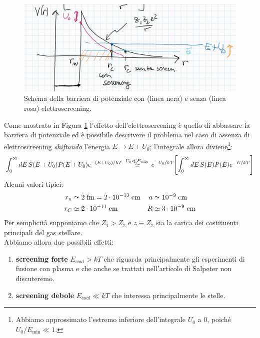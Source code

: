 \begin{figure}[!h]
    \centering
    \includegraphics[scale=0.3]{Immagini/0329_pot_ES.png}
    \caption{Schema della barriera di potenziale con (linea nera) e senza (linea rosa) elettroscreening.}
    \label{0329_schema}
\end{figure}
\noindent Come mostrato in Figura \ref{0329_schema} l'effetto dell'elettroscreening è quello di abbassare la barriera di potenziale ed è possibile descrivere il problema nel caso di assenza di elettroscreening \textit{shiftando} l'energia $E\to E+U_0$; l'integrale allora diviene\footnote{Abbiamo approssimato l'estremo inferiore dell'integrale $U_0$ a 0, poiché $U_0/E_{\min{}}\ll1$.}:
$$\int_0^\infty dE\, S(E+U_0) P(E+U_0) e^{-(E+U_0)/kT}\: \stackrel{U_0\ll E_{\max{}}}{\simeq} e^{-U_0/kT}\Biggl [ \int_0^\infty dE\, S(E) P(E) e^{-E/kT} \Biggr ]$$
Alcuni valori tipici:
\begin{displaymath}
\begin{aligned}
r_n &\simeq 2\;\mbox{fm} = 2\cdot10^{-13}\;\mbox{cm} & a   &\simeq 10^{-9}\;\mbox{cm}\\
r_C &\simeq 2\cdot10^{-11}\;\mbox{cm} & R   &\simeq 3\cdot10^{-9}\;\mbox{cm}
\end{aligned}
\end{displaymath}
Per semplicità supponiamo che $Z_1>Z_2$ e $z\equiv Z_2$ sia la carica dei costituenti principali del gas stellare.\\ Abbiamo allora due possibili effetti:
\begin{enumerate}
    \item \textbf{screening forte} $E_{coul} > kT$ che riguarda principalmente gli esperimenti di fusione con plasma e che anche se trattati nell'articolo di Salpeter non discuteremo.
    \item \textbf{screening debole} $E_{coul}\ll kT$ che interessa principalmente le stelle.
\end{enumerate}

